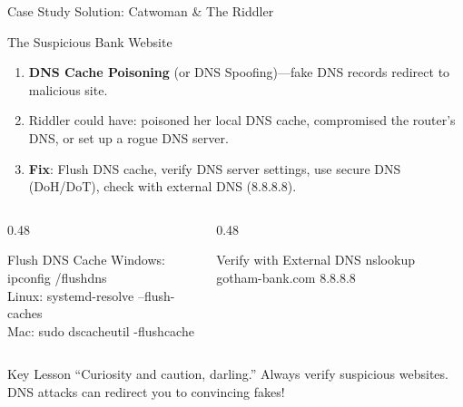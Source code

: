 \documentclass[aspectratio=169]{beamer}  %
\begin{document}
\begin{frame}{Case Study Solution: Catwoman \& The Riddler}
    \begin{casesolution}{The Suspicious Bank Website}
        \small
        \begin{enumerate}\setlength{\itemsep}{1pt}
            \item \textbf{DNS Cache Poisoning} (or DNS Spoofing)---fake DNS records redirect to malicious site.
            \item Riddler could have: poisoned her local DNS cache, compromised the router's DNS, or set up a rogue DNS server.
            \item \textbf{Fix}: Flush DNS cache, verify DNS server settings, use secure DNS (DoH/DoT), check with external DNS (8.8.8.8).
        \end{enumerate}
    \end{casesolution}
    
    \vspace{0.2em}
    \begin{columns}[T]
        \begin{column}{0.48\textwidth}
            \begin{block}{Flush DNS Cache}
                \ttfamily\small
                Windows: ipconfig /flushdns \\
                Linux: systemd-resolve --flush-caches \\
                Mac: sudo dscacheutil -flushcache
            \end{block}
        \end{column}
        \begin{column}{0.48\textwidth}
            \begin{block}{Verify with External DNS}
                \ttfamily\small
                nslookup gotham-bank.com 8.8.8.8
            \end{block}
        \end{column}
    \end{columns}
    
    \vspace{0.2em}
    \begin{alertblock}{Key Lesson}
        \small
        ``Curiosity and caution, darling.'' Always verify suspicious websites. DNS attacks can redirect you to convincing fakes!
    \end{alertblock}
\end{frame}
\end{document}
